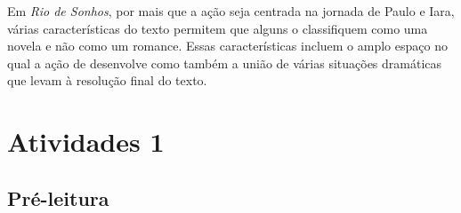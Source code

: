 \documentclass[12pt]{extarticle}
\begin{document}
Em \textit{Rio de Sonhos},  por mais que a ação seja centrada na jornada de Paulo e Iara,  
várias características do texto  permitem que alguns o classifiquem como uma novela e não 
como um romance.
Essas características incluem o amplo espaço no qual a ação de desenvolve  como também a união de várias situações dramáticas  que levam à resolução final do texto.


\section{Atividades 1}
\subsection{Pré-leitura}

\end{document}

